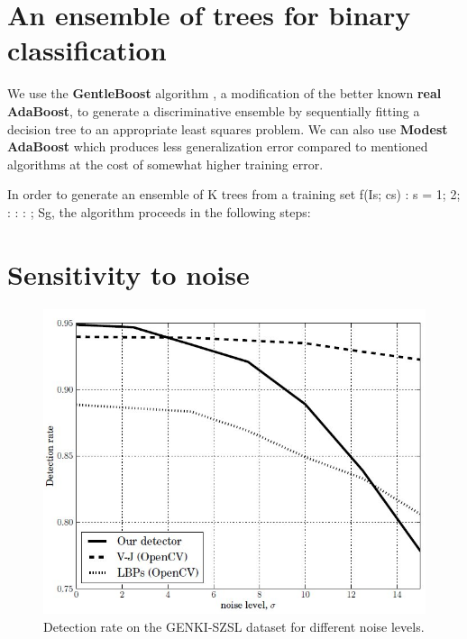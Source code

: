 \documentclass[a4paper,12pt]{article}
\begin{document}
\section{An ensemble of trees for binary classification}
We use the \textbf{GentleBoost} algorithm \cite{Friedman98additivelogistic}, a modification of the better known \textbf{real AdaBoost}, to generate a discriminative ensemble by sequentially fitting a decision tree to an appropriate least squares problem.
We can also use \textbf{Modest AdaBoost} which produces less generalization error compared to mentioned algorithms at the cost of somewhat higher training error. \cite{GML327}

In order to generate an ensemble of K trees from a training
set f(Is; cs) : s = 1; 2; : : : ; Sg, the algorithm proceeds in the
following steps:


\section{Sensitivity to noise}
\begin{figure}[ht]
  \centering
  \includegraphics[width=\textwidth, keepaspectratio=true]{ObjectDetectionPixelIntensityFig6-.jpg}
  \caption{Detection rate on the GENKI-SZSL dataset for different noise levels.}
 \label{fig:fig6}
\end{figure}
\end{document}
